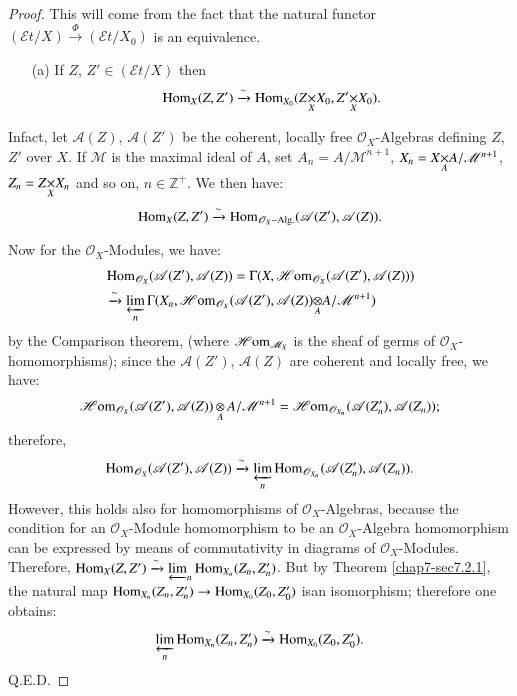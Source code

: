 \begin{proof}
This will come from the fact that the natural functor
$(\mathscr{E}t/X)\xrightarrow{\Phi}(\mathscr{E}t/X_{0})$ is an
equivalence.
\begin{itemize}
\item[(a)] If $Z$, $Z'\in(\mathscr{E}t/X)$ then
$$
\Hom_{X}(Z,Z')\xrightarrow{\sim}\Hom_{X_{0}}(\fprod{Z}{X_{0}}{X},\fprod{Z'}{X_{0}}{X}). 
$$
\end{itemize}

In\pageoriginale fact, let $\mathscr{A}(Z)$, $\mathscr{A}(Z')$ be the
coherent, locally free $\mathscr{O}_{X}$-Algebras defining $Z$, $Z'$
over $X$. If $\mathscr{M}$ is the maximal ideal of $A$, set
$A_{n}=A/\mathscr{M}^{n+1}$,
$X_{n}=\fprod{X}{A}{A}/\mathscr{M}^{n+1}$, $Z_{n}=\fprod{Z}{X_{n}}{X}$
and so on, $n\in\mathbb{Z}^{+}$. We then have:
$$
\operatorname{Hom}_{X}(Z,Z')\xrightarrow{\sim}\operatorname{Hom}_{\mathscr{O}_{X}-\text{Alg.}}(\mathscr{A}(Z'),\mathscr{A}(Z)). 
$$

Now for the $\mathscr{O}_{X}$-Modules, we have:
\begin{align*}
& \Hom_{\mathscr{O}_{X}}(\mathscr{A}(Z'),\mathscr{A}(Z))=\Gamma(X,\Hhom_{\mathscr{O}_{X}}(\mathscr{A}(Z'),\mathscr{A}(Z)))\\ 
&\xrightarrow{\sim}\varprojlim_{n}\Gamma(X_{n},\Hhom_{\mathscr{O}_{X}}
\foprod{(\mathscr{A}(Z'),\mathscr{A}(Z))}{A/\mathscr{M}^{n+1}}{A})
\end{align*}
by the Comparison theorem, (where $\operatorname{\mathscr{H}om}_{\mathscr{M}_{X}}$ is the
sheaf of germs of $\mathscr{O}_{X}$-homomorphisms); since the
$\mathscr{A}(Z')$, $\mathscr{A}(Z)$ are coherent and locally free, we
have:
$$
\operatorname{\mathscr{H}om}_{\mathscr{O}_{X}}(\mathscr{A}(Z'),\mathscr{A}(Z))\mathop{\otimes}_{A}A/\mathscr{M}^{n+1}=\operatorname{\mathscr{H}om}_{\mathscr{O}_{X_{n}}}(\mathscr{A}(Z'_{n}),\mathscr{A}(Z_{n}));
$$
therefore,
$$
\operatorname{Hom}_{\mathscr{O}_{X}}(\mathscr{A}(Z'),\mathscr{A}(Z))\xrightarrow{\sim}\varprojlim_{n}\operatorname{Hom}_{\mathscr{O}_{X_{n}}}(\mathscr{A}(Z'_{n}),\mathscr{A}(Z_{n})).
$$
However,
this holds also for homomorphisms of $\mathscr{O}_{X}$-Algebras,
because the condition for an $\mathscr{O}_{X}$-Module homomorphism to
be an $\mathscr{O}_{X}$-Algebra homomorphism can be expressed by means
of commutativity in diagrams of $\mathscr{O}_{X}$-Modules. Therefore,
$\operatorname{Hom}_{X}(Z,Z')\xrightarrow{\sim}\varprojlim_{n}\operatorname{Hom}_{X_{n}}(Z_{n},Z'_{n})$. But
by Theorem \ref{chap7-sec7.2.1}, the natural map
$\operatorname{Hom}_{X_{n}}(Z_{n},Z'_{n})\to \operatorname{Hom}_{X_{0}}(Z_{0},Z'_{0})$
is\pageoriginale an isomorphism; therefore one obtains:
$$
\varprojlim_{n}\operatorname{Hom}_{X_{n}}(Z_{n},Z'_{n})\xrightarrow{\sim}\operatorname{Hom}_{X_{0}}(Z_{0},Z'_{0}). 
$$
\hfill Q.E.D.
\end{proof}

